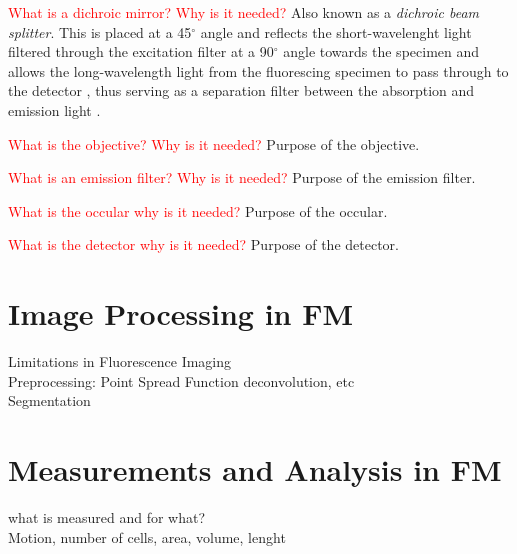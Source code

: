 \begin{definition}
	\textcolor{red}{What is a dichroic mirror? Why is it needed?}
	Also known as a \textit{dichroic beam splitter}.
	This is placed at a 45$^{\circ}$ angle and reflects the short-wavelenght light filtered through the excitation filter at a 90$^{\circ}$ angle towards the specimen \citep{Danek2012,Hubeny2008,Spring2003,CudeBurke2014} and allows the long-wavelength light from the fluorescing specimen to pass through to the detector \citep{LichtmanConchello2005}, thus serving as a separation filter between the absorption and emission light \citep{Fatima2008,Dobrucki2013}.
\end{definition}

\begin{definition}[Objective]
	\textcolor{red}{What is the objective? Why is it needed?}
	Purpose of the objective.
\end{definition}


\begin{definition}
	\textcolor{red}{What is an emission filter? Why is it needed?}
	Purpose of the emission filter.
\end{definition}

\begin{definition}[Occular]
	\textcolor{red}{What is the occular why is it needed?}
	Purpose of the occular.
\end{definition}

\begin{definition}[Detector]
	\textcolor{red}{What is the detector why is it needed?}
	Purpose of the detector.
\end{definition}


\section{Image Processing in FM}
\label{sec:ImageProcessingInFM}

Limitations in Fluorescence Imaging\\
Preprocessing: Point Spread Function deconvolution, etc\\
Segmentation 


\section{Measurements and Analysis in FM}
\label{sec:Measurements}

what is measured and for what?\\
Motion, number of cells, area, volume, lenght